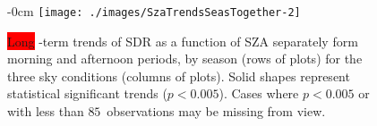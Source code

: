 \documentclass[applsci,article,accept,moreauthors,pdftex]{Definitions/mdpi}
\begin{document}
\vspace{-6pt}


\begin{figure}[H]
    \begin{adjustwidth}{-\extralength}{0cm}
        {\centering
            \texttt{[image: ./images/SzaTrendsSeasTogether-2]}
        }
   \end{adjustwidth}
        \caption{\colorbox{red}{Long} %
 -term trends of SDR as a function of SZA separately form morning
               and afternoon periods, by season (rows of plots) for the three sky
               conditions (columns of plots).
               Solid shapes represent statistical significant trends ($p<0.005$).
               Cases where $p<0.005$ or with less than $85$~observations may be
               missing from view.}\label{fig:SZAtrendSeason}
 
\end{figure}




\FloatBarrier

%
\end{document}
